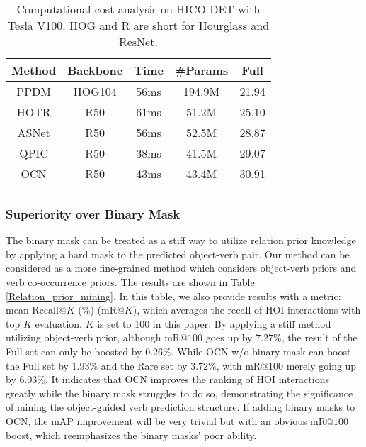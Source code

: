 \documentclass[letterpaper]{article} %
\begin{document}
\begin{table}[t]
  \small
  \setlength{\tabcolsep}{0pt}
  \centering
    \begin{tabular}{ccccc}
    \Xhline{1.0pt}
    \textbf{Method} & {\footnotesize \textbf{Backbone}} & \textbf{Time} & \textbf{\#Params} & \textbf{Full} \\
    \hline
    \hline
    PPDM \cite{liao2020ppdm}  & HOG104 & 56ms    & 194.9M  & 21.94  \\
    HOTR \cite{kim2021hotr} & R50   & 61ms    & 51.2M  & 25.10  \\
    ASNet \cite{chen2021ASNet} & R50   & 56ms    & 52.5M  & 28.87  \\
    {\scriptsize QPIC \cite{tamura2021qpic}} & R50   & 38ms    & 41.5M  & 29.07  \\
    \hline
    OCN  & R50   & 43ms    & 43.4M  & 30.91  \\
    \Xhline{1.0pt}
    \end{tabular}%
    \caption{Computational cost analysis on HICO-DET with Tesla V100. HOG and R are short for Hourglass and ResNet.}
  \label{Computation_cost}%
\end{table}%


\subsubsection{Superiority over Binary Mask} The binary mask can be treated as a stiff way to utilize relation prior knowledge by applying a hard mask to the predicted object-verb pair. Our method can be considered as a more fine-grained method which considers object-verb priors and verb co-occurrence priors. The results are shown in Table \ref{Relation_prior_mining}. In this table, we also provide results with a metric: mean Recall@$K$ (\%) \cite{tang2020unbiasedSG} (mR@$K$), which averages the recall of HOI interactions with top $K$ evaluation. $K$ is set to 100 in this paper. By applying a stiff method utilizing object-verb prior, although mR@$100$ goes up by $7.27\%$, the result of the Full set can only be boosted by $0.26\%$. While OCN w/o binary mask can boost the Full set by $1.93\%$ and the Rare set by $3.72\%$, with mR@$100$ merely going up by $6.03\%$. It indicates that OCN improves the ranking of HOI interactions greatly while the binary mask struggles to do so, demonstrating the significance of mining the object-guided verb prediction structure. If adding binary masks to OCN, the mAP improvement will be very trivial but with an obvious mR@$100$ boost, which reemphasizes the binary masks' poor ability.
\end{document}
